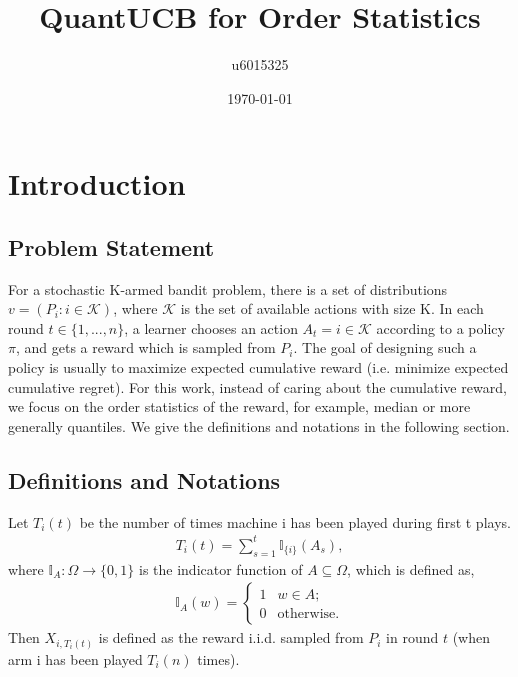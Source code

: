 \documentclass{article}
\title{QuantUCB for Order Statistics}
\author{u6015325 }
\date{\today}
\theoremstyle{plain}
\begin{document}
\maketitle

\section{Introduction}

\subsection{Problem Statement}

    For a stochastic K-armed bandit problem, there is a set of distributions $v = (P_i: i \in \mathcal{K})$, where $\mathcal{K}$ is the set of available actions with size K. In each round $t \in \{1, ..., n\}$, a learner chooses an action $A_t = i \in \mathcal{K}$ according to a policy $\pi$, and gets a reward which is sampled from $P_i$. The goal of designing such a policy is usually to maximize expected cumulative reward (i.e. minimize expected cumulative regret). For this work, instead of caring about the cumulative reward, we focus on the order statistics of the reward, for example, median or more generally quantiles. We give the definitions and notations in the following section.

\subsection{Definitions and Notations}

    Let $T_i(t)$ be the number of times machine i has been played during first t plays.
    \begin{align}
        T_i(t) = \sum_{s = 1}^t \mathbb{I}_{\{i\}} (A_s),
    \end{align}
    where $\mathbb{I}_A: \Omega\rightarrow \{0,1\}$ is the indicator function of $A \subseteq \Omega$, which is defined as,
    \begin{align}
        \mathbb{I}_A(w) = \begin{cases}
                            1 & w \in A;\\
                            0 & \text{otherwise}.
                            \end{cases}
    \end{align}
    Then $X_{i,T_i(t)}$ is defined as the reward i.i.d. sampled from $P_i$ in round $t$ (when arm i has been played $T_i(n)$ times). \\
\end{document}
